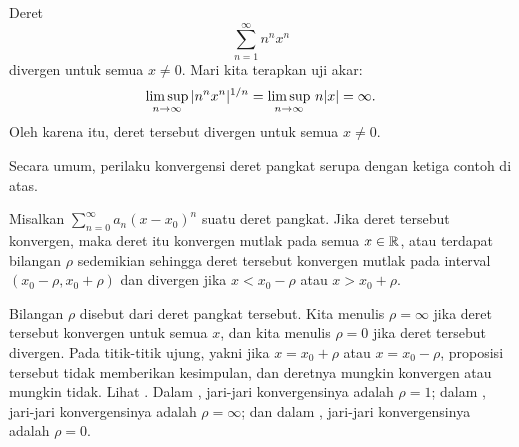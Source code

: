 \begin{example} \label{ps:divergeex}
Deret
\begin{equation*}
\sum_{n=1}^\infty n^n x^n
\end{equation*}
divergen untuk semua $x \neq 0$.  Mari kita terapkan uji akar:
\begin{equation*}
\limsup_{n\to\infty}
\,
\lvert {n^n x^n} \rvert^{1/n}
=
\limsup_{n\to\infty}
\,
n \lvert {x} \rvert
= \infty .
\end{equation*}
Oleh karena itu, deret tersebut divergen untuk semua $x \neq 0$.
\end{example}

Secara umum, perilaku konvergensi deret pangkat serupa dengan
ketiga contoh di atas.

\begin{prop} \label{prop:powerserrealradius}
Misalkan $\sum_{n=0}^\infty a_n {(x-x_0)}^n$ suatu deret pangkat.
Jika deret tersebut konvergen, maka deret itu konvergen mutlak pada
semua $x \in {\mathbb{R}}$, atau
terdapat bilangan $\rho$ sedemikian sehingga
deret tersebut konvergen mutlak pada interval
$(x_0-\rho,x_0+\rho)$ dan divergen jika $x < x_0-\rho$ atau $x > x_0+\rho$.
\end{prop}

Bilangan $\rho$ disebut \emph{} dari
deret pangkat tersebut.  Kita menulis $\rho = \infty$ jika deret tersebut konvergen untuk
semua $x$, dan kita menulis $\rho = 0$ jika deret tersebut divergen.
Pada titik-titik ujung, yakni jika $x = x_0+\rho$ atau $x = x_0-\rho$,
proposisi tersebut tidak memberikan kesimpulan,
dan deretnya mungkin konvergen atau mungkin tidak.
Lihat .
Dalam ,
jari-jari konvergensinya adalah $\rho=1$;
dalam , jari-jari konvergensinya adalah $\rho=\infty$;
dan dalam , jari-jari konvergensinya adalah $\rho=0$.

\begin{myfigureht}
\caption{Kekonvergenan suatu deret pangkat.\label{ps:convfig}}
\end{myfigureht}

